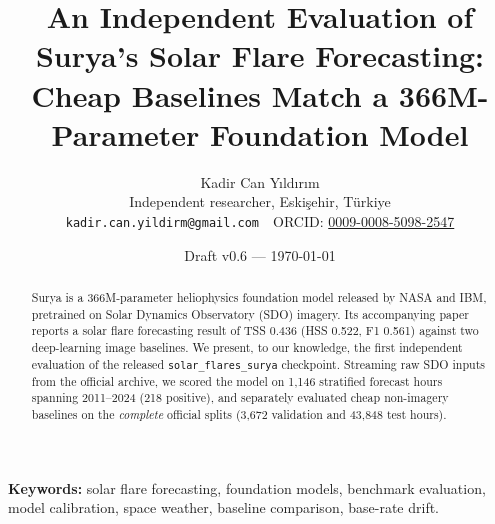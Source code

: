 \documentclass[11pt]{article}
\title{An Independent Evaluation of Surya's Solar Flare Forecasting:\\
Cheap Baselines Match a 366M-Parameter Foundation Model}
\author{Kadir Can Y\i{}ld\i{}r\i{}m\\[2pt]
\small Independent researcher, Eski\c{s}ehir, T\"urkiye\\
\small \texttt{kadir.can.yildirm@gmail.com} \,\textperiodcentered\,
ORCID: \href{https://orcid.org/0009-0008-5098-2547}{0009-0008-5098-2547}}
\date{Draft v0.6 --- \today}
\newcommand{\code}[1]{\texttt{#1}}
\begin{document}
\maketitle

\begin{center}
\begin{minipage}{0.86\textwidth}
\small\textbf{Keywords:} solar flare forecasting, foundation models, benchmark
evaluation, model calibration, space weather, baseline comparison, base-rate
drift.
\end{minipage}
\end{center}
\vspace{6pt}

\begin{abstract}
Surya is a 366M-parameter heliophysics foundation model released by NASA and IBM,
pretrained on Solar Dynamics Observatory (SDO) imagery. Its accompanying paper
reports a solar flare forecasting result of TSS 0.436 (HSS 0.522, F1 0.561)
against two deep-learning image baselines. We present, to our knowledge, the first independent
evaluation of the released \code{solar\_flares\_surya} checkpoint. Streaming raw
SDO inputs from the official archive, we scored the model on 1{,}146 stratified
forecast hours spanning 2011--2024 (218 positive), and separately evaluated cheap
non-imagery baselines on the \emph{complete} official splits (3{,}672 validation
and 43{,}848 test hours).


\end{abstract}
\end{document}
